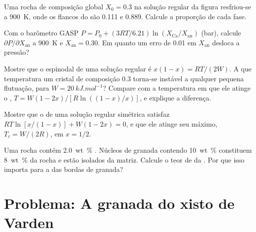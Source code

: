 \begin{exercise}[$\star\star$]\label{exo:b3:petrological-thermodynamics:8}
Uma rocha de composição global $X_0 = 0.3$ na solução regular da figura
resfriou-se a \qty{900}{K}, onde os flancos do  são 0.111 e 0.889.
Calcule a proporção de cada fase.
\end{exercise}

\begin{exercise}[$\star\star$]\label{exo:b3:petrological-thermodynamics:9}
Com o barômetro GASP $P = P_0 + (3RT/6.21)\ln(X_{\text{Ca}}/X_{\text{an}})$
(bar), calcule $\partial P/\partial X_{\text{an}}$ a \qty{900}{K} e
$X_{\text{an}} = 0.30$. Em quanto um erro de 0.01 em $X_{\text{an}}$
desloca a pressão?
\end{exercise}

\begin{exercise}[$\star\star\star$]\label{exo:b3:petrological-thermodynamics:10}
Mostre que o espinodal de uma solução regular é $x(1 - x) = RT/(2W)$. A que
temperatura um cristal de composição 0.3 torna-se instável a qualquer pequena
flutuação, para $W = \qty{20}{kJ.mol^{-1}}$? Compare com a temperatura em que
ele atinge o , $T = W(1 - 2x)/[R\ln((1 - x)/x)]$, e explique
a diferença.
\end{exercise}

\begin{exercise}[$\star\star\star$]\label{exo:b3:petrological-thermodynamics:11}
Mostre que o  de uma solução regular simétrica satisfaz $RT\ln[x/(1 -
x)] + W(1 - 2x) = 0$, e que ele atinge seu máximo, $T_c = W/(2R)$, em $x
= 1/2$.
\end{exercise}

\begin{exercise}[$\star\star\star$]\label{exo:b3:petrological-thermodynamics:12}
 Uma rocha contém \qty{2.0}{wt\percent} . Núcleos de granada contendo
 \qty{10}{wt\percent}  constituem \qty{8}{wt\percent} da rocha e estão
 isolados da matriz. Calcule o teor de  da
 . Por que isso importa para a  das bordas de granada?
\end{exercise}

\section{Problema: A granada do xisto de Varden}


